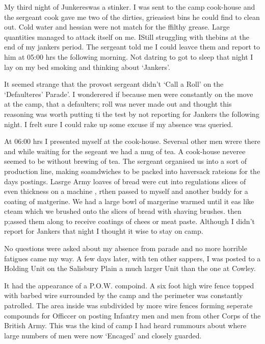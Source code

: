 My third night of Junkereswas a stinker. I was sent to the camp
cook-house and the sergeant cook gave me two of the dirties,
grieasiest bins he could find to clean out. Cold water and hessian
were not match for the ffilthy grease. Large quantities managed to
attack itself on me. IStill struggling with thebins at the end of my
jankers period. The sergeant told me I could leavce them and report to
him at 05:00 hrs the following morning. Not datring to got to sleep
that night I lay on my bed smoking and thinking about `Jankers'.

It seemed strange that the provost sergeant didn't `Call a Roll' on
the `Defaulteres' Parade'. I wonderered if because men were constantly
on the move at the camp, that a defaulters; roll was never made out
and thought this reasoning was worth putting ti the test by not
reporting for Jankers the following night. I frelt sure I could rake
up some excuse if my absence was queried.

At 06:00 hrs I presented myself at the cook-house. Seversal other men
wrere there and while waiting for the segeant we had a mug of tea. A
cook-house neveree seemed to be without brewing of tea. The sergeant
organised us into a sort of production line, making soamdwiches to be
packed into haversack rateions for the days postings. Lasrge Army
loaves of bread were cut into regulations slices of even thickness on
a machine , rthen passed to myself and another buddy for a coating of
matgerine. We had a large bowl of margerine warmed until it eas like
cteam which we brushed onto the slices of bread with shaving
brushes. then p;assed them along to receive coatings of chees or meat
paste. Although I didn't report for Jankers that night I thought it
wise to stay on camp.

No questions were asked about my absence from parade and no more
horrible fatigues came my way. A few days later, with ten other
sappers, I was posted to a Holding Unit on the Salisbury Plain a much
larger Unit than the one at Cowley.

It had the appearance of a P.O.W. compoind. A six foot high wire fence
topped with barbed wire surrounded by the camp and the perimeter was
constantly patrolled. The area inside was subdivided by more wire
fences forming seperate compounds for Officcer on posting Infantry men
and men from other Corps of the British Army. This was the kind of
camp I had heard rummours about where large numbers of men were now
`Encaged' and closely guarded.

